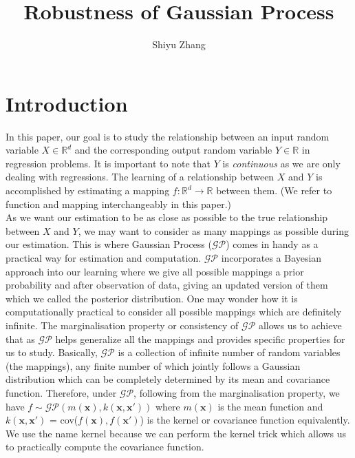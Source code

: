\documentclass{article}
\title{Robustness of Gaussian Process}
\author{Shiyu Zhang }
\date{}
\begin{document}
\maketitle

\section{Introduction}
In this paper, our goal is to study the relationship between an input random variable $X \in \mathbb{R}^d$  and the corresponding output random variable $Y \in \mathbb{R}$ in regression problems. It is important to note that $Y$ is \emph{continuous} as we are only dealing with regressions. The learning of a relationship between $X$ and $Y$ is accomplished by estimating a mapping $f\colon \mathbb{R}^{d} \to \mathbb{R}$ between them. (We refer to function and mapping interchangeably in this paper.) \vspace{5mm}\\
As we want our estimation to be as close as possible to the true relationship between $X$ and $Y$, we may want to consider as many mappings as possible during our estimation. This is where Gaussian Process ($\mathcal{GP}$) comes in handy as a practical way for estimation and computation. $\mathcal{GP}$ incorporates a Bayesian approach into our learning where we give all possible mappings a prior probability and after observation of data, giving an updated version of them which we called the posterior distribution. One may wonder how it is computationally practical to consider all possible mappings which are definitely infinite. The marginalisation property or consistency of $\mathcal{GP}$ allows us to achieve that as $\mathcal{GP}$ helps generalize all the mappings and provides specific properties for us to study. Basically, $\mathcal{GP}$ is a collection of infinite number of random variables (the mappings), any finite number of which jointly follows a Gaussian distribution which can be completely determined by its mean and covariance function. Therefore, under $\mathcal{GP}$, following from the marginalisation property, we have $f \sim \mathcal{GP}(m(\mathbf{x}), k(\mathbf{x}, \mathbf{x'}))$ where $m(\mathbf{x})$ is the mean function and $k(\mathbf{x}, \mathbf{x'})$ = cov($f(\mathbf{x}),f(\mathbf{x'})$) is the kernel or covariance function equivalently. We use the name kernel because we can perform the kernel trick which allows us to practically compute the covariance function. \vspace{5mm}\\
\end{document}
